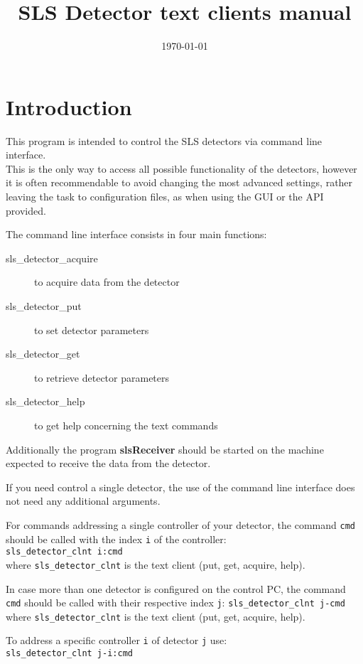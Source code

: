 \documentclass{article}
\begin{document}
\title{SLS Detector text clients manual}
\date{\today}
\maketitle



\section{Introduction}

This program is intended to control the SLS detectors via command line interface.\\
This is the only way to access all possible functionality of the detectors, however it is often recommendable to avoid changing the most advanced settings, rather leaving the task to configuration files, as when using the GUI or the API provided.

The command line interface consists in four main functions:
\begin{description}
\item[sls\_detector\_acquire] to acquire data from the detector
\item[sls\_detector\_put] to set detector parameters
\item[sls\_detector\_get] to retrieve detector parameters
\item[sls\_detector\_help] to get help concerning the text commands
\end{description}
Additionally the program \textbf{slsReceiver} should be started on the machine expected to receive the data from the detector.


If you need control a single detector, the use of the command line interface does not need any additional arguments.

For commands addressing a single controller of your detector, the command  \verb=cmd= should be called with the index \verb=i= of the controller:\\
\verb=sls_detector_clnt i:cmd=\\
where \verb=sls_detector_clnt= is the text client (put, get, acquire, help).

In case more than one detector is configured on the control PC, the command  \verb=cmd= should be called with their respective index  \verb=j=:
\verb=sls_detector_clnt j-cmd=\\
where \verb=sls_detector_clnt= is the text client (put, get, acquire, help).

To address a specific controller \verb=i= of detector \verb=j= use:\\
\verb=sls_detector_clnt j-i:cmd=
\end{document}

